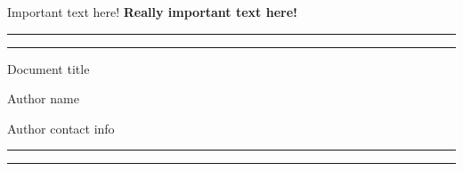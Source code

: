 
{\small{
Important text here!
\hfill
\textbf{Really important text here!}
}}

\vspace*{0.5cm}


\rule{\linewidth}{0.4pt}
\rule{\linewidth}{0.4pt}

{\Large{\bf
\centerline{Document title}
}}


\vspace*{.1in}
{\large
\centerline{Author name}}
{
\centerline{Author contact info}}
\rule{\linewidth}{0.4pt}
\rule{\linewidth}{0.4pt}